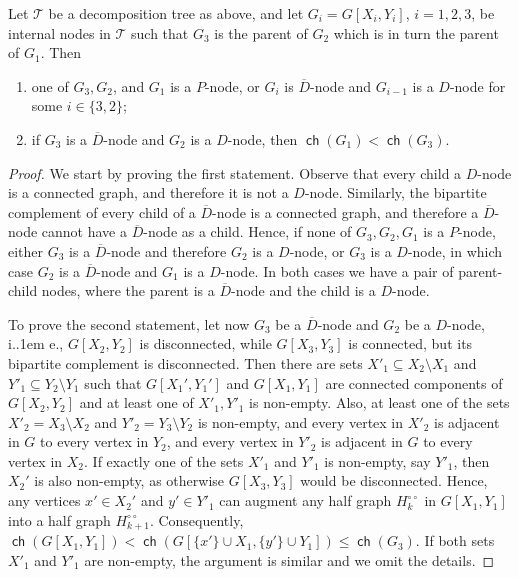 \documentclass{theoretics}
\makeatletter
\newcommand{\cT}{\ensuremath{\mathcal{T}}}
\newcommand*\ie{i.\kern.1em e.\@\xspace} %
\DeclareMathOperator\ch{\mathsf{ch}}
\makeatother
\begin{document}
\begin{claim}
	\label{cl: Qk-properties}
	Let $\cT$ be a decomposition tree as above, and
	let $G_i = G[X_i, Y_i]$, $i = 1,2,3$, be internal nodes in $\cT$ such that 
	$G_3$ is the parent of $G_2$ which is in turn the parent of $G_1$.
	Then 
	\begin{enumerate}[label=\textup{(\arabic*)}]
		\item one of $G_3, G_2$, and $G_1$ is a $P$-node, or $G_i$ is $\overline D$-node and $G_{i-1}$ is a $D$-node for some $i \in \{3,2\}$;
		\item if $G_3$ is a $\overline D$-node and $G_2$ is a $D$-node, then $\ch(G_1) < \ch(G_3)$.
	\end{enumerate}
\end{claim}
\begin{proof}
	We start by proving the first statement. Observe that every child a $D$-node is a connected graph, and therefore
	it is not a $D$-node. Similarly, the bipartite complement of every child of a $\overline D$-node is a connected graph,
	and therefore a $\overline D$-node cannot have a $\overline D$-node as a child.
	Hence, if none of $G_3, G_2, G_1$ is a $P$-node, either $G_3$ is a $\overline D$-node and therefore $G_2$ is a 
	$D$-node, or $G_3$ is a $D$-node, in which case $G_2$ is a $\overline D$-node and $G_1$ is a $D$-node.
	In both cases we have a pair of parent-child nodes, where the parent is a $\overline D$-node and the child is 
	a $D$-node.
	
	To prove the second statement, let now $G_3$ be a $\overline D$-node and $G_2$ be a $D$-node, \ie, 
	$G[X_2,Y_2]$ is disconnected, while $G[X_3,Y_3]$ is connected, but its bipartite complement is disconnected. 
	Then there are sets $X'_1 \subseteq X_2 \setminus X_1$ and $Y'_1 \subseteq Y_2 \setminus Y_1$ such that
	$G[X_1',Y_1']$ and $G[X_1,Y_1]$ are connected components of $G[X_2,Y_2]$ and at least one of $X'_1,Y'_1$ is non-empty.
	Also, at least one of the sets $X'_2 = X_3 \setminus X_2$ and $Y'_2 = Y_3 \setminus Y_2$ is non-empty,
	and every vertex in $X'_2$ is adjacent in $G$ to every vertex in $Y_2$, and
	every vertex in $Y'_2$ is adjacent in $G$ to every vertex in $X_2$. 
	If exactly one of the sets $X'_1$ and $Y'_1$ is non-empty, say $Y'_1$, then $X_2'$ is also non-empty, as otherwise  $G[X_3,Y_3]$ would be disconnected. Hence, any vertices $x' \in X_2'$ and $y' \in Y'_1$
	can augment any half graph $H^{\circ\circ}_k$ in $G[X_1,Y_1]$ into a half graph $H^{\circ\circ}_{k+1}$.
	Consequently, $\ch(G[X_1,Y_1]) < \ch(G[\{ x'\} \cup X_1, \{ y' \} \cup Y_1]) \leq \ch(G_3)$.
	If both sets $X'_1$ and $Y'_1$ are non-empty, the argument is similar and we omit the details.
\end{proof}
\end{document}
